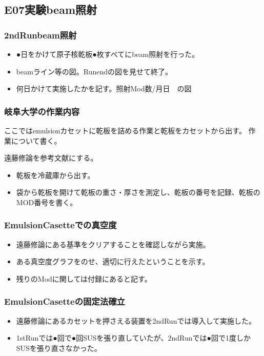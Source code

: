 \documentclass[12pt,a4paper]{jarticle}
\begin{document}
\subsection{E07実験beam照射}
\subsubsection{2ndRunbeam照射}
\begin{itemize}
 \item ●日をかけて原子核乾板●枚すべてにbeam照射を行った。
 \item beamライン等の図。Runendの図を見せて終了。
 \item 何日かけて実施したかを記す。照射Mod数/月日　の図
\end{itemize}
\subsubsection{岐阜大学の作業内容}
ここではemulsionカセットに乾板を詰める作業と乾板をカセットから出す。
作業について書く。
\par
遠藤修論を参考文献にする。
\begin{itemize}
 \item 乾板を冷蔵庫から出す。
 \item 袋から乾板を開けて乾板の重さ・厚さを測定し、乾板の番号を記録、乾板のMOD番号を書く。
\end{itemize}
\subsubsection{EmulsionCasetteでの真空度}
\begin{itemize}
 \item 遠藤修論にある基準をクリアすることを確認しながら実施。
 \item ある真空度グラフをのせ、適切に行えたということを示す。
 \item 残りのModに関しては付録にあると記す。
\end{itemize}
\subsubsection{EmulsionCasetteの固定法確立}
\begin{itemize}
 \item 遠藤修論にあるカセットを押さえる装置を2ndRunでは導入して実施した。
 \item 1stRunでは●回で●回SUSを張り直していたが、2ndRunでは●回で1度しかSUSを張り直さなかった。
\end{itemize}
\end{document}
